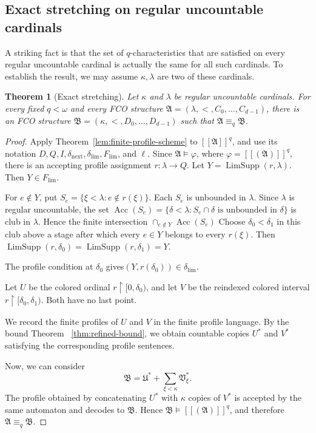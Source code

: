 \documentclass{amsart}
\newtheorem{theorem}{Theorem}
\theoremstyle{definition}
\begin{document}
\subsection{Exact stretching on regular uncountable cardinals}
A striking fact is that the set of $q$-characteristics that are satisfied on every regular uncountable cardinal is actually the same for all such cardinals. To establish the result, we may assume $\kappa,\lambda$ are two of these cardinals.
\begin{theorem}[Exact stretching]\label{lem:exact-stretching}
    Let $\kappa$ and $\lambda$ be regular uncountable cardinals. For every fixed $q<\omega$ and every FCO structure $\mathfrak{A}=(\lambda,<,C_0,\dots,C_{d-1})$, there is an FCO structure $\mathfrak{B}=(\kappa,<,D_0,\dots,D_{d-1})$ such that $\mathfrak{A}\equiv_q\mathfrak{B}$.
\end{theorem}
\begin{proof}

Apply Theorem~\ref{lem:finite-profile-scheme} to $[[\mathfrak A]]^q$, and use its notation
$D,Q,I,\delta_{\mathrm{next}},\delta_{\mathrm{lim}},F_{\mathrm{lim}}$, and
$\ell$.  Since $\mathfrak A\models\varphi$, where $\varphi=[[(\mathfrak A)]]^q$, there is an accepting profile assignment $r\colon\lambda\to Q$.
Let
$
Y=\operatorname{LimSupp}(r,\lambda).
$
Then $Y\in F_{\mathrm{lim}}$.

 For $e\notin Y$, put $S_e=\{\xi<\lambda:e\notin r(\xi)\}.$
Each $S_e$ is unbounded in $\lambda$.  Since $\lambda$ is regular
uncountable, the set
$
  \operatorname{Acc}(S_e)=
  \{\delta<\lambda:S_e\cap\delta\text{ is unbounded in }\delta\}$
  is club in $\lambda$.  Hence the finite intersection
   $\cap_{e\notin Y}\operatorname{Acc}(S_e)$
Choose $\delta_0<\delta_1$ in this club above a stage after which every $e\in Y$ belongs to every $r(\xi)$. Then
$
  \operatorname{LimSupp}(r,\delta_0)=
  \operatorname{LimSupp}(r,\delta_1)=Y.
 $

The profile
condition at $\delta_0$ gives$  (Y,r(\delta_0))\in\delta_{\mathrm{lim}}.$

Let $U$ be the colored ordinal
$r\mathbin{\upharpoonright}[0,\delta_0)$, and let $V$ be the reindexed
colored interval
$r\mathbin{\upharpoonright}[\delta_0,\delta_1)$.  Both
have no last point.

We record the finite profiles of $U$ and $V$ in the finite profile language. By the bound Theorem ~\ref{thm:refined-bound}, we obtain countable copies $U^*$ and $V^*$ satisfying the corresponding profile sentences.

Now, we can consider
\[
  \mathfrak B= \mathfrak U^*+\sum_{\xi<\kappa}\mathfrak V^*_{\xi}.
\]
The profile obtained by concatenating $U^*$ with $\kappa$ copies of $V^*$ is accepted by the same automaton and decodes to $\mathfrak B$. Hence $\mathfrak B\models[[(\mathfrak A)]]^q$, and therefore $\mathfrak A\equiv_q\mathfrak B$.

\end{proof}
\end{document}
